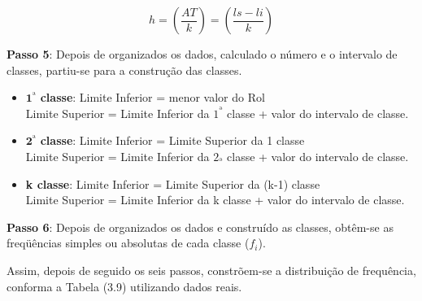$$ h = \left(\frac{AT}{k} \right)= \left(\frac{ls-li}{k} \right)$$


\textbf{Passo 5}: Depois de organizados os dados, calculado o número e o intervalo de classes, partiu-se para a construção das classes.


\begin{itemize}
  \item $\textbf{1}^{ª}$ \textbf{classe}: Limite Inferior = menor valor do Rol\\
  Limite Superior = Limite Inferior da $1^{ª}$ classe + valor do intervalo de classe.
  \item $\textbf{2}^{ª}$ \textbf{classe}: Limite Inferior = Limite Superior da 1 classe\\
  Limite Superior = Limite Inferior da $2_{ª}$ classe + valor do intervalo de classe.
  \item \textbf{k classe}: Limite Inferior = Limite Superior da (k-1) classe\\
               Limite Superior = Limite Inferior da k classe + valor do intervalo de classe.
\end{itemize}



\textbf{Passo 6}: Depois de organizados os dados e construído as classes, obtêm-se as freqüências simples ou absolutas de cada classe ($f_{i}$).\vskip0.3cm

Assim, depois de seguido os seis passos, constrõem-se a distribuição de frequência, conforma a Tabela (3.9) utilizando dados reais.


